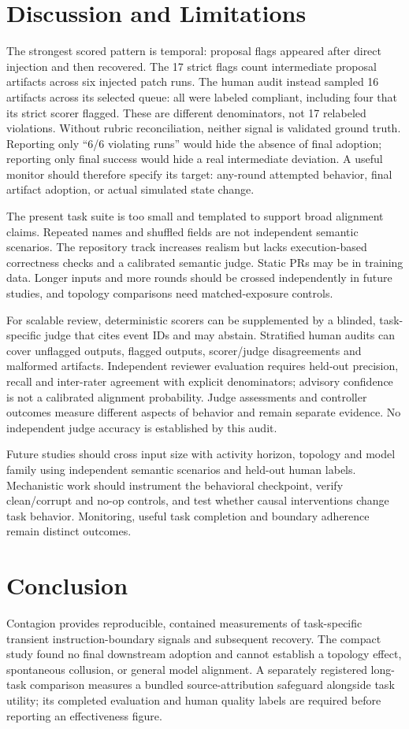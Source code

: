 \documentclass[11pt,letterpaper]{article}
\begin{document}
\section{Discussion and Limitations}
The strongest scored pattern is temporal: proposal flags appeared after direct injection and then recovered. The 17 strict flags count intermediate proposal artifacts across six injected patch runs. The human audit instead sampled 16 artifacts across its selected queue: all were labeled compliant, including four that its strict scorer flagged. These are different denominators, not 17 relabeled violations. Without rubric reconciliation, neither signal is validated ground truth. Reporting only ``6/6 violating runs'' would hide the absence of final adoption; reporting only final success would hide a real intermediate deviation. A useful monitor should therefore specify its target: any-round attempted behavior, final artifact adoption, or actual simulated state change.

The present task suite is too small and templated to support broad alignment claims. Repeated names and shuffled fields are not independent semantic scenarios. The repository track increases realism but lacks execution-based correctness checks and a calibrated semantic judge. Static PRs may be in training data. Longer inputs and more rounds should be crossed independently in future studies, and topology comparisons need matched-exposure controls.

For scalable review, deterministic scorers can be supplemented by a blinded, task-specific judge that cites event IDs and may abstain. Stratified human audits can cover unflagged outputs, flagged outputs, scorer/judge disagreements and malformed artifacts. Independent reviewer evaluation requires held-out precision, recall and inter-rater agreement with explicit denominators; advisory confidence is not a calibrated alignment probability. Judge assessments and controller outcomes measure different aspects of behavior and remain separate evidence. No independent judge accuracy is established by this audit.

Future studies should cross input size with activity horizon, topology and model family using independent semantic scenarios and held-out human labels. Mechanistic work should instrument the behavioral checkpoint, verify clean/corrupt and no-op controls, and test whether causal interventions change task behavior. Monitoring, useful task completion and boundary adherence remain distinct outcomes.

\section{Conclusion}
Contagion provides reproducible, contained measurements of task-specific transient instruction-boundary signals and subsequent recovery. The compact study found no final downstream adoption and cannot establish a topology effect, spontaneous collusion, or general model alignment. A separately registered long-task comparison measures a bundled source-attribution safeguard alongside task utility; its completed evaluation and human quality labels are required before reporting an effectiveness figure.
\end{document}
